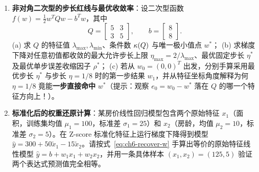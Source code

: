 \begin{enumerate}[label=\textbf{6.\arabic*}, resume]
  \item \textbf{非对角二次型的步长红线与最优收敛率}：设二次型函数 $f(w) = \frac{1}{2}w^T Q w - b^T w$，其中
  \[
    Q = \begin{bmatrix} 5 & 3 \\ 3 & 5 \end{bmatrix}, \qquad b = \begin{bmatrix} 8 \\ 8 \end{bmatrix}.
  \]
  (a) 求 $Q$ 的特征值 $\lambda_{\max}, \lambda_{\min}$、条件数 $\kappa(Q)$ 与唯一极小值点 $w^*$；
  (b) 求梯度下降对任意初值都收敛的最大允许步长上限 $\eta_{\max} = 2/\lambda_{\max}$、最优固定步长 $\eta^*$ 及最优单步误差收缩因子 $\rho^*$；
  (c) 若从 $w_0 = (0, 0)^T$ 出发，分别手算采用最优步长 $\eta^*$ 与步长 $\eta = 1/8$ 时的第一步结果 $w_1$，并从特征坐标角度解释为何 $\eta = 1/8$ 竟能\textbf{一步直接命中} $w^*$（提示：观察 $e_0 = w_0 - w^*$ 落在 $Q$ 的哪一个特征方向上！）。

  \item \textbf{标准化后的权重还原计算}：某房价线性回归模型包含两个原始特征 $x_1$（面积，训练集均值 $\mu_1 = 100$，标准差 $\sigma_1 = 25$）和 $x_2$（房龄，均值 $\mu_2 = 10$，标准差 $\sigma_2 = 5$）。在 Z-score 标准化特征上运行梯度下降得到模型 $\hat{y} = 300 + 50\tilde{x}_1 - 15\tilde{x}_2$。请按式~\eqref{eq:ch6-recover-w} 手算出等价的原始特征线性模型 $\hat{y} = b + w_1 x_1 + w_2 x_2$，并用一条具体样本 $(x_1, x_2) = (125, 5)$ 验证两个表达式预测值完全相等。
\end{enumerate}

